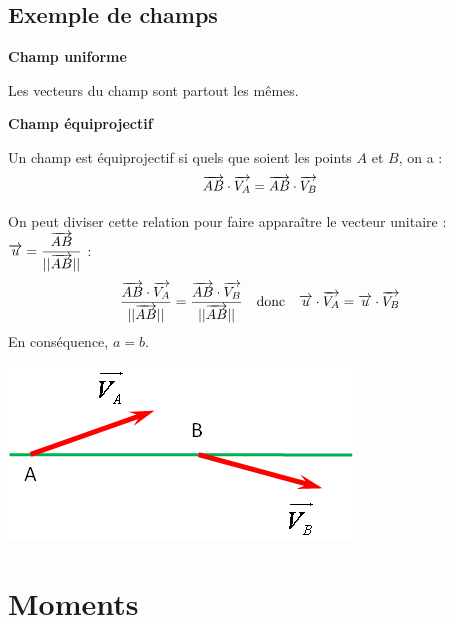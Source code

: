 \documentclass[10pt,oneside]{article}
\begin{document}
\subsection{Exemple de champs}

\begin{defi}
\textbf{Champ uniforme}

Les vecteurs du champ sont partout les mêmes. 

\end{defi}

\begin{defi}
\textbf{Champ équiprojectif}

Un champ est équiprojectif si quels que soient les points $A$ et $B$, on a : 
$$
\overrightarrow{AB}\cdot \overrightarrow{V_A} = \overrightarrow{AB}\cdot \overrightarrow{V_B} 
$$

\end{defi}

\begin{rem}
\begin{minipage}[c]{.47\linewidth}
On peut diviser cette relation pour faire apparaître le vecteur unitaire : $\overrightarrow{u}=\dfrac{\overrightarrow{AB}}{||\overrightarrow{AB}||}$ : 
$$
\dfrac{\overrightarrow{AB}\cdot \overrightarrow{V_A} }{||\overrightarrow{AB}||} 
=\dfrac{\overrightarrow{AB}\cdot \overrightarrow{V_B} }{||\overrightarrow{AB}||} 
\quad \text{donc} \quad
\overrightarrow{u}\cdot \overrightarrow{V_A} = \overrightarrow{u}\cdot \overrightarrow{V_B} 
$$ 
 En conséquence, $a=b$.

\end{minipage}\hfill
\begin{minipage}[c]{.47\linewidth}

\begin{center}
\includegraphics[width=.8\textwidth]{png/equiproj}
\end{center}
\end{minipage}
\end{rem}

\section{Moments}
\end{document}

